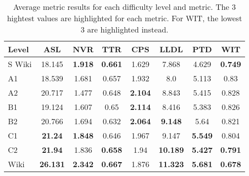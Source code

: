 \begin{table*}[ht]
    \centering
    \begin{tabular}{lccccccc}
        \hline
        \textbf{Level} &       \textbf{ASL} &      \textbf{NVR} &      \textbf{TTR} &      \textbf{CPS} &      \textbf{LLDL} &      \textbf{PTD} &      \textbf{WIT} \\
        \hline
        S Wiki &  18.145            &  \textbf{1.918}   &  \textbf{0.661}   &  1.629            &   7.868           &  4.629            &  \textbf{0.749} \\
        \hline
        A1     &  18.539            &  1.681            &  0.657            &  1.932            &     8.0           &  5.113            &           0.83 \\
        \hline
        A2     &  20.717            &  1.477            &  0.648            &  \textbf{2.104}   &   8.843           &  5.415            &           0.828 \\
        \hline
        B1     &  19.124            &  1.607            &   0.65            &  \textbf{2.114}   &   8.416           &  5.383            &           0.826 \\
        \hline
        B2     &  20.766            &  1.694            &  0.632            &  \textbf{2.064}   &   \textbf{9.148}  &   5.64            &           0.821 \\
        \hline
        C1     &  \textbf{21.24}    &  \textbf{1.848}   &  0.646            &  1.967            &   9.147           &  \textbf{5.549}   &           0.804 \\
        \hline
        C2     &  \textbf{21.94}    &  1.836            &  \textbf{0.658}   &   1.94            &  \textbf{10.189}  &  \textbf{5.427}   &  \textbf{0.791} \\
        \hline
        Wiki   &  \textbf{26.131}   &  \textbf{2.342}   &  \textbf{0.667}   &  1.876            &  \textbf{11.323}  &  \textbf{5.681}   &  \textbf{0.678} \\
        \hline
    \end{tabular}
    \caption{
        \centering
        Average metric results for each difficulty level and metric. The 3 hightest values are highlighted for each metric. For WIT, the lowest 3 are highlighted instead.
    }
    \label{tab:means}
\end{table*}